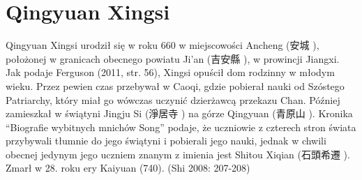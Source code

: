 \section{Qingyuan Xingsi}
Qingyuan Xingsi urodził się w roku 660 w miejscowości Ancheng (安城 ), położonej w granicach obecnego powiatu Ji'an (吉安縣 ), w prowincji Jiangxi.
Jak podaje Ferguson (2011, str. 56), Xingsi opuścił dom rodzinny w młodym wieku.
Przez pewien czas przebywał w Caoqi, gdzie pobierał nauki od Szóstego Patriarchy, który miał go wówczas uczynić dzierżawcą przekazu Chan.
Później zamieszkał w świątyni Jingju Si (淨居寺 ) na górze Qingyuan (青原山 ).
Kronika ``Biografie wybitnych mnichów Song'' podaje, że uczniowie z czterech stron świata przybywali tłumnie do jego świątyni i pobierali jego nauki, jednak w chwili obecnej jedynym jego uczniem znanym z imienia jest Shitou Xiqian (石頭希遷 ).
Zmarł w 28. roku ery Kaiyuan (740).
(Shi 2008: 207-208)

